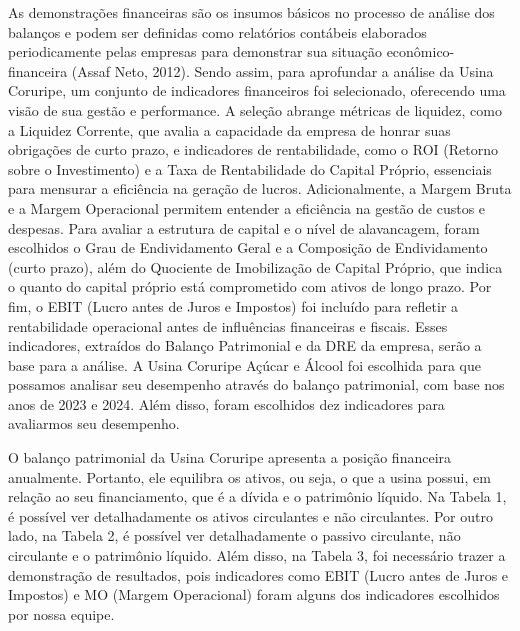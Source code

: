 \documentclass[1pt,a4paper]{article}
\begin{document}
	As demonstrações financeiras são os insumos básicos no processo de análise dos balanços e podem ser definidas como relatórios contábeis elaborados periodicamente pelas empresas para demonstrar sua situação econômico-financeira (Assaf Neto, 2012). Sendo assim, para aprofundar a análise da Usina Coruripe, um conjunto de indicadores financeiros foi selecionado, oferecendo uma visão de sua gestão e performance. A seleção abrange métricas de liquidez, como a Liquidez Corrente, que avalia a capacidade da empresa de honrar suas obrigações de curto prazo, e indicadores de rentabilidade, como o ROI (Retorno sobre o Investimento) e a Taxa de Rentabilidade do Capital Próprio, essenciais para mensurar a eficiência na geração de lucros. Adicionalmente, a Margem Bruta e a Margem Operacional permitem entender a eficiência na gestão de custos e despesas. Para avaliar a estrutura de capital e o nível de alavancagem, foram escolhidos o Grau de Endividamento Geral e a Composição de Endividamento (curto prazo), além do Quociente de Imobilização de Capital Próprio, que indica o quanto do capital próprio está comprometido com ativos de longo prazo. Por fim, o EBIT (Lucro antes de Juros e Impostos) foi incluído para refletir a rentabilidade operacional antes de influências financeiras e fiscais. Esses indicadores, extraídos do Balanço Patrimonial e da DRE da empresa, serão a base para a análise. A Usina Coruripe Açúcar e Álcool foi escolhida para que possamos analisar seu desempenho através do balanço patrimonial, com base nos anos de 2023 e 2024. Além disso, foram escolhidos dez indicadores para avaliarmos seu desempenho.
	
	O balanço patrimonial da Usina Coruripe apresenta a posição financeira anualmente. Portanto, ele equilibra os ativos, ou seja, o que a usina possui, em relação ao seu financiamento, que é a dívida e o patrimônio líquido. Na Tabela 1, é possível ver detalhadamente os ativos circulantes e não circulantes. Por outro lado, na Tabela 2, é possível ver detalhadamente o passivo circulante, não circulante e o patrimônio líquido. Além disso, na Tabela 3, foi necessário trazer a demonstração de resultados, pois indicadores como EBIT (Lucro antes de Juros e Impostos) e MO (Margem Operacional) foram alguns dos indicadores escolhidos por nossa equipe.
	
\end{document}
